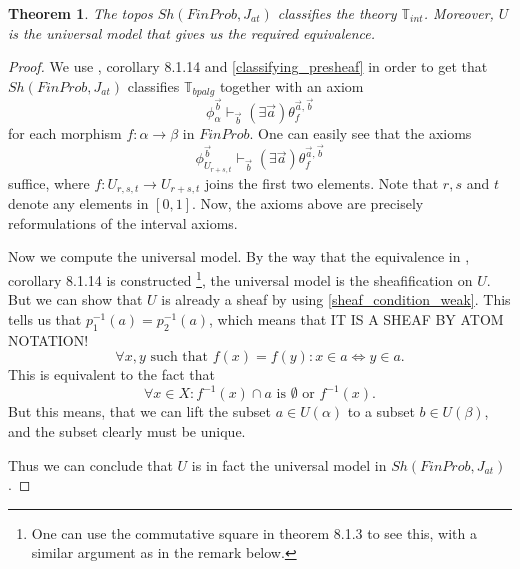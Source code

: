 \documentclass[a4paper]{amsproc}
\theoremstyle{plain}
\newtheorem{theorem}{Theorem}[section]
\theoremstyle{definition}
\theoremstyle{remark}
\numberwithin{equation}{section}
\begin{document}
\begin{theorem} \label{classifying}
The topos $Sh(FinProb,J_{at})$ classifies the theory $\mathbb{T}_{int}$. Moreover, $U$ is the universal model that gives us the required equivalence.
\end{theorem}
\begin{proof}
We use \cite{caramello_book}, corollary 8.1.14 and \ref{classifying_presheaf} in order to get that $Sh(FinProb,J_{at})$ classifies $\mathbb{T}_{bpalg}$ together with an axiom
\[
\phi_{\alpha}^{\vec{b}} \vdash_{\vec{b}} (\exists \vec{a}) \theta_f^{\vec{a},\vec{b}}
\]
for each morphism $f: \alpha \to \beta$ in $FinProb$. One can easily see that the axioms
\[
\phi_{U_{r+s,t}}^{\vec{b}} \vdash_{\vec{b}} (\exists \vec{a}) \theta_f^{\vec{a},\vec{b}}
\]
suffice, where $f: U_{r,s,t} \to U_{r+s,t}$ joins the first two elements. Note that $r,s$ and $t$ denote any elements in $[0,1]$. Now, the axioms above are precisely reformulations of the interval axioms.

Now we compute the universal model. By the way that the equivalence in \cite{caramello_book}, corollary 8.1.14 is constructed \footnote{One can use the commutative square in theorem 8.1.3 to see this, with a similar argument as in the remark below.}, the universal model is the sheafification on $U$. But we can show that $U$ is already a sheaf by using \ref{sheaf_condition_weak}. This tells us that $p_1^{-1}(a) = p_2^{-1}(a)$, which means that
IT IS A SHEAF BY ATOM NOTATION! %
\[
\forall x,y \text{ such that } f(x) = f(y): x \in a \Leftrightarrow y \in a .
\]
This is equivalent to the fact that
\[
\forall x \in X: f^{-1}(x) \cap a \text{ is } \emptyset \text{ or } f^{-1}(x) .
\]
But this means, that we can lift the subset $a \in U(\alpha)$ to a subset $b \in U(\beta)$, and the subset clearly must be unique.

Thus we can conclude that $U$ is in fact the universal model in $Sh(FinProb, J_{at})$.
\end{proof}
\end{document}
